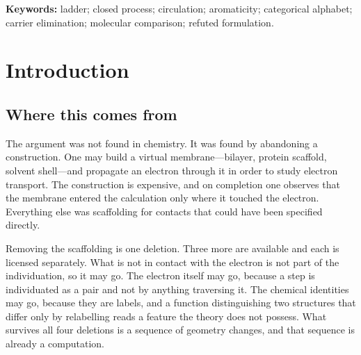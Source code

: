 \documentclass[11pt,a4paper]{article}
\theoremstyle{clthm}
\theoremstyle{definition}
\theoremstyle{remark}
\newcommand{\unif}{u}
\begin{document}
\begin{abstract}
Applied to chemistry, a molecule is a closed ladder over a finite
categorical alphabet, and comparison becomes comparison of typed words.
Because a word is ordered, the correspondence is connected by
construction, which repairs the principal stated limitation of an earlier
element-free matcher. The positional asymmetry that matcher measured but
could not explain---heteroatom substitution preserving structural class
when peripheral and degrading it when in-ring---is here predicted:
peripheral substitution leaves $\unif$ exactly unchanged ($0.000$) while
ring substitution lowers it ($\ge 0.086$).
\end{abstract}

\noindent\textbf{Keywords:} ladder; closed process; circulation;
aromaticity; categorical alphabet; carrier elimination; molecular
comparison; refuted formulation.

\tableofcontents

\section{Introduction}
\label{sec:intro}

\subsection{Where this comes from}

The argument was not found in chemistry. It was found by abandoning a
construction. One may build a virtual membrane---bilayer, protein
scaffold, solvent shell---and propagate an electron through it in order to
study electron transport. The construction is expensive, and on completion
one observes that the membrane entered the calculation only where it
touched the electron. Everything else was scaffolding for contacts that
could have been specified directly.

Removing the scaffolding is one deletion. Three more are available and
each is licensed separately. What is not in contact with the electron is
not part of the individuation, so it may go. The electron itself may go,
because a step is individuated as a pair and not by anything traversing
it. The chemical identities may go, because they are labels, and a
function distinguishing two structures that differ only by relabelling
reads a feature the theory does not possess. What survives all four
deletions is a sequence of geometry changes, and that sequence is already
a computation.
\end{document}
